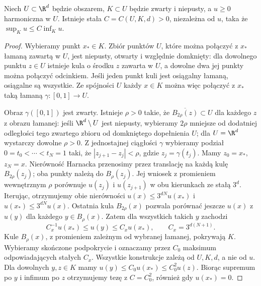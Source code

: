 \begin{wniosek}
\label{cor:pde14-harnack-chain}
Niech $U\subset\R^d$ będzie obszarem,
$K\subset U$ będzie zwarty i niepusty, a $u\ge0$ harmoniczna
w $U$. Istnieje stała $C=C(U,K,d)>0$, niezależna od $u$,
taka że $\sup_Ku\le C\inf_Ku$.
\end{wniosek}
\begin{proof}
Wybieramy punkt $x_*\in K$. Zbiór punktów $U$, które
można połączyć z $x_*$ łamaną zawartą w $U$, jest niepusty,
otwarty i względnie domknięty: dla dowolnego punktu $z\in U$
istnieje kula o środku $z$ zawarta w $U$, a dowolne dwa
jej punkty można połączyć odcinkiem. Jeśli jeden punkt
kuli jest osiągalny łamaną, osiągalne są wszystkie.
Ze spójności $U$ każdy $x\in K$ można więc połączyć
z $x_*$ taką łamaną $\gamma:[0,1]\to U$.

Obraz $\gamma([0,1])$ jest zwarty. Istnieje $\rho>0$
takie, że $\overline{B_{2\rho}(z)}\subset U$ dla każdego
$z$ z obrazu łamanej: jeśli $\R^d\setminus U$ jest
niepusty, wybieramy $2\rho$ mniejsze od dodatniej odległości
tego zwartego zbioru od domkniętego dopełnienia $U$;
dla $U=\R^d$ wystarczy dowolne $\rho>0$.
Z jednostajnej ciągłości $\gamma$ wybieramy podział
$0=t_0<\cdots<t_N=1$ taki, że
$|z_{j+1}-z_j|<\rho$, gdzie $z_j=\gamma(t_j)$.
Mamy $z_0=x_*$, $z_N=x$.
Nierówność Harnacka przenosimy przez translację na każdą
kulę $B_{2\rho}(z_j)$; oba punkty należą do $B_\rho(z_j)$.
Jej wniosek z promieniem wewnętrznym $\rho$ porównuje $u(z_j)$
i $u(z_{j+1})$ w obu kierunkach ze stałą $3^d$.
Iterując, otrzymujemy obie nierówności
$u(x)\le 3^{dN}u(x_*)$ i $u(x_*)\le 3^{dN}u(x)$.
Ostatnia kula $B_{2\rho}(x)$ pozwala porównać jeszcze
$u(x)$ z $u(y)$ dla każdego $y\in B_\rho(x)$.
Zatem dla wszystkich takich $y$ zachodzi
\[
 C_x^{-1}u(x_*)\le u(y)\le C_xu(x_*),
 \qquad C_x=3^{d(N+1)}.
\]
Kule $B_\rho(x)$, z promieniem zależnym od wybranej łamanej,
pokrywają $K$. Wybieramy skończone podpokrycie i oznaczamy
przez $C_0$ maksimum odpowiadających stałych $C_x$.
Wszystkie konstrukcje zależą od $U,K,d$, a nie od $u$.
Dla dowolnych $y,z\in K$ mamy
$u(y)\le C_0u(x_*)\le C_0^2u(z)$.
Biorąc supremum po $y$ i infimum po $z$ otrzymujemy tezę
z $C=C_0^2$, również gdy $u(x_*)=0$.
\end{proof}

